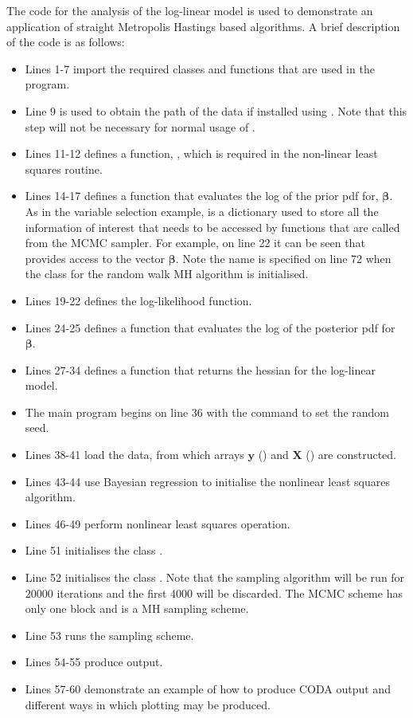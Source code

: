 \documentclass[article]{jss}
\begin{document}
The code for the analysis of the log-linear model is used to
demonstrate an application of straight Metropolis Hastings based
algorithms.  A brief description of the code is as follows:
\begin{itemize}
\item Lines 1-7 import the required classes and functions that are
  used in the program.
\item Line 9 is used to obtain the path of the data if installed
  using . Note that this step will not be necessary for
  normal usage of .
\item Lines 11-12 defines a function, , which is
  required in the non-linear least squares routine.
\item Lines 14-17 defines a function that evaluates the log of the
  prior pdf for, $\bm{\beta}.$ As in the variable selection example,
   is a  dictionary used to store all the
  information of interest that needs to be accessed by functions that
  are called from the MCMC sampler. For example, on line 22 it can be
  seen that  provides access to the vector
  $\bm{\beta}.$ Note the name  is specified on line 72
  when the class for the random walk MH algorithm is initialised.
\item Lines 19-22 defines the log-likelihood function.
\item Lines 24-25 defines a function that evaluates the log of the
  posterior pdf for $\bm{\beta}.$
\item Lines 27-34 defines a function that returns the hessian for the
  log-linear model.
\item The main program begins on line 36 with the command to set the
  random seed.
\item Lines 38-41 load the data, from which arrays $\bm{y}$
  () and $\bm{X}$ () are constructed.
\item Lines 43-44 use Bayesian regression to initialise the nonlinear
  least squares algorithm.
\item Lines 46-49 perform nonlinear least squares operation.
\item Line 51 initialises the class . 
\item Line 52 initialises the class  . Note that the
  sampling algorithm will be run for 20000 iterations and the first
  4000 will be discarded. The MCMC scheme has only one block and is a
  MH sampling scheme.
\item Line 53 runs the sampling scheme.
\item Lines 54-55 produce output.
\item Lines 57-60 demonstrate an example of how to produce CODA output
  and different ways in which plotting may be produced.
\end{itemize}
\end{document}
